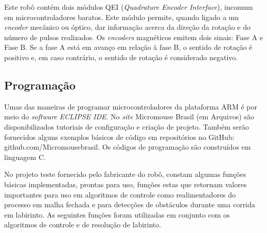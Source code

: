 Este robô contém dois módulos QEI (\textit{Quadrature Encoder Interface}), incomum em microcontroladores baratos. Este módulo permite, quando ligado a um \textit{encoder} mecânico ou óptico, dar informação acerca da direção da rotação e do número de pulsos realizados. Os \textit{encoders} magnéticos emitem dois sinais: Fase A e Fase B. Se a fase A está em avanço em relação à fase B, o sentido de rotação é positivo e, em caso contrário, o sentido de rotação é considerado negativo.

\subsection{Programação}
Umas das maneiras de programar microcontroladores da plataforma ARM é por meio do \textit{software} \textit{ECLIPSE IDE}. No \textit{site} Micromouse Brasil (em Arquivos) são disponibilizados tutoriais de configuração e criação de projeto. Também serão fornecidos alguns exemplos básicos de código em repositórios no GitHub: github.com/Micromousebrasil. Os códigos de programação são construídos em linguagem C.

No projeto teste fornecido pelo fabricante do robô, constam algumas funções básicas implementadas, prontas para uso, funções estas que retornam valores importantes para uso em algoritmos de controle como realimentadores do processo em malha fechada e para detecções de obstáculos durante uma corrida em labirinto. As seguintes funções foram utilizadas em conjunto com os algoritmos de controle e de resolução de labirinto.

